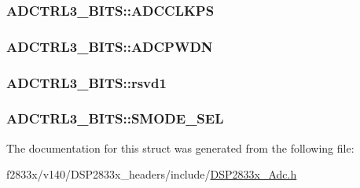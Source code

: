 \subsubsection[{A\+D\+C\+C\+L\+K\+P\+S}]{ A\+D\+C\+T\+R\+L3\+\_\+\+B\+I\+T\+S\+::\+A\+D\+C\+C\+L\+K\+P\+S}\label{struct_a_d_c_t_r_l3___b_i_t_s_a101b40b8eb1c2f225ade8410befdb79c}
\hypertarget{struct_a_d_c_t_r_l3___b_i_t_s_a63e48dbc08f2cc7951825dac9686e67c}{}
\subsubsection[{A\+D\+C\+P\+W\+D\+N}]{ A\+D\+C\+T\+R\+L3\+\_\+\+B\+I\+T\+S\+::\+A\+D\+C\+P\+W\+D\+N}\label{struct_a_d_c_t_r_l3___b_i_t_s_a63e48dbc08f2cc7951825dac9686e67c}
\hypertarget{struct_a_d_c_t_r_l3___b_i_t_s_a3fbabc9eec1f460823df0efa8b79833c}{}
\subsubsection[{rsvd1}]{ A\+D\+C\+T\+R\+L3\+\_\+\+B\+I\+T\+S\+::rsvd1}\label{struct_a_d_c_t_r_l3___b_i_t_s_a3fbabc9eec1f460823df0efa8b79833c}
\hypertarget{struct_a_d_c_t_r_l3___b_i_t_s_a899955fce9492d0eae5592b8c253bcac}{}
\subsubsection[{S\+M\+O\+D\+E\+\_\+\+S\+E\+L}]{ A\+D\+C\+T\+R\+L3\+\_\+\+B\+I\+T\+S\+::\+S\+M\+O\+D\+E\+\_\+\+S\+E\+L}\label{struct_a_d_c_t_r_l3___b_i_t_s_a899955fce9492d0eae5592b8c253bcac}


The documentation for this struct was generated from the following file\+:\begin{DoxyCompactItemize}
\item 
f2833x/v140/\+D\+S\+P2833x\+\_\+headers/include/\hyperlink{_d_s_p2833x___adc_8h}{D\+S\+P2833x\+\_\+\+Adc.\+h}\end{DoxyCompactItemize}
